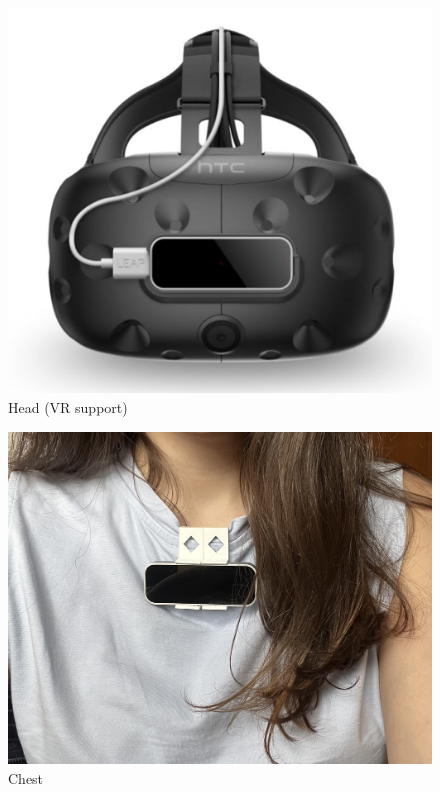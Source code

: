 \begin{table}[!htb]
    \begin{minipage}{\linewidth}
        \centering
        \begin{subfigure}{0.49\textwidth}
            \centering
            \includegraphics[width=\linewidth]{figures/VRsupport.png}
            \caption{Head (VR support)}
        \end{subfigure}
        \begin{subfigure}{0.49\textwidth}
            \includegraphics[width=\linewidth]{figures/CMD.jpg}
            \centering
            \caption{Chest}
        \end{subfigure}
        \label{fig:CMDvsHMD}
	\end{minipage}
\end{table}

